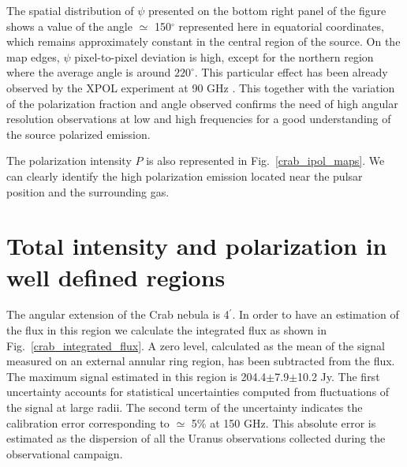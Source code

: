 \documentclass[twocolumn,traditabstract]{aa}
\begin{document}
The spatial distribution of $\psi$ presented on the bottom right panel of the figure shows a value of the angle $\simeq$ 150$^{\circ}$ represented here in equatorial coordinates, which remains approximately constant in the central region of the source. On the map edges, $\psi$ pixel-to-pixel deviation is high, except for the northern region where the average angle is around $220^{\circ}$. This particular effect has been already observed by the XPOL experiment at 90 GHz \citep{aumont2010}.
This together with the variation of the polarization fraction and angle observed confirms the need of high angular resolution observations at low and high frequencies for a good understanding of the source polarized emission.

The polarization intensity $P$ is also represented in Fig.~\ref{crab_ipol_maps}. We can clearly identify the high polarization emission located near the pulsar position and the surrounding gas. 

\section{Total intensity and polarization in well defined regions}\label{sec:Polarization estimates in CMB experiments like beams}
The angular extension of the Crab nebula is 4$^{\prime}$. In order to have an estimation of the flux in this region we calculate the integrated flux as shown in Fig.~\ref{crab_integrated_flux}. A zero level, calculated as the mean of the signal measured on an external annular ring region, has been subtracted from the flux. The maximum signal estimated in this region is 204.4$\pm$7.9$\pm$10.2 Jy. The first uncertainty accounts for statistical uncertainties computed from fluctuations of the signal at large radii. The second term of the uncertainty indicates the calibration error corresponding to  $\simeq$ 5\% at 150 GHz. This absolute error is estimated as the dispersion of all the Uranus observations collected during the observational campaign.
\end{document}
